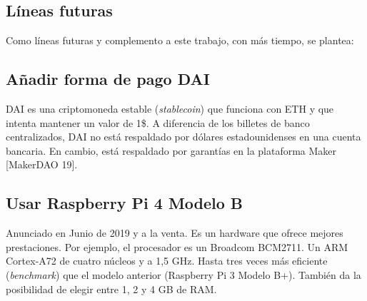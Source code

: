 \documentclass[12pt]{amsart}
\begin{document}
\begin{multicols}{2}
\section{Líneas futuras}\label{sec:future}
Como líneas futuras y complemento a este trabajo, con más tiempo, se plantea:
\subsection{Añadir forma de pago DAI} \label{ch:dai}
DAI es una criptomoneda estable (\textit{stablecoin}) que funciona con ETH y que intenta mantener un valor de 1\$. A diferencia de los billetes de banco centralizados, DAI no está respaldado por dólares estadounidenses en una cuenta bancaria. En cambio, está respaldado por garantías en la plataforma Maker [MakerDAO 19].
\subsection{Usar Raspberry Pi 4 Modelo B} \label{ch:rpi4modelb}
Anunciado en Junio de 2019 y a la venta. Es un hardware que ofrece mejores prestaciones. Por ejemplo, el procesador es un Broadcom BCM2711. Un ARM Cortex-A72 de cuatro núcleos y a 1,5 GHz. Hasta tres veces más eficiente (\textit{benchmark}) que el modelo anterior (Raspberry Pi 3 Modelo B+). También da la posibilidad de elegir entre 1, 2 y 4 GB de RAM.

\end{multicols}
\end{document}

